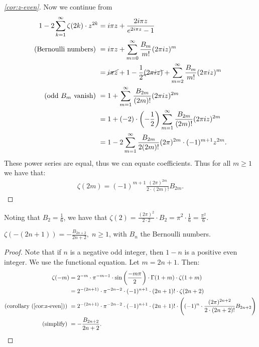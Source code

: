\begin{proof}[\ref{cor:z-even}]
Now we continue from
\begin{align*}
    1 - 2 \sum_{k=1}^\infty \zeta(2k) \cdot z^{2k} &= i \pi z + \frac{2i \pi z}{e^{2 i \pi z} - 1}\\
    \text{(Bernoulli numbers) }&= i \pi z + \sum_{m=0}^\infty \frac{B_m}{m!} (2 \pi i z)^m\\
    &= \cancel{i \pi z} + 1 - \frac{1}{2}\cancel{(2 \pi i z)} + \sum_{m=2}^\infty \frac{B_m}{m!} (2 \pi i z)^m\\
    \text{(odd $B_m$ vanish) } &= 1 + \sum_{m=1}^\infty \frac{B_{2m}}{(2m)!} (2 \pi i z)^{2m}\\
    &= 1 + (-2) \cdot \left( -\frac{1}{2} \right) \sum_{m=1}^\infty \frac{B_{2m}}{(2m)!} (2 \pi i z)^{2m}\\
    &= 1 - 2\sum_{m=1}^\infty \frac{B_{2m}}{2 (2m)!} (2 \pi)^{2m} \cdot (-1)^{m+1} z^{2m}.
\end{align*}
These power series are equal, thus we can equate coefficients. Thus for all $m \geq 1$ we have that:
\begin{align*}
    \zeta(2m) = (-1)^{m+1} \frac{(2\pi)^{2m}}{2 \cdot (2m)!} B_{2m}.
\end{align*}

\end{proof}

\begin{example} Noting that $B_2 = \frac{1}{6}$, we have that $\zeta(2) = \frac{(2\pi)^2}{2\cdot 2}\cdot B_2 = \pi ^ 2 \cdot \frac{1}{6} = \frac{\pi ^2 }{6}$.
\end{example}


\begin{corollary}\label{cor:z-neg-odd}
$\zeta(-(2n+1))= - \frac{B_{2n+2}}{2n+2}, \; n \geq 1$, with $B_n$ the Bernoulli numbers.
\end{corollary}

\begin{proof}
Note that if $n$ is a negative odd integer, then $1-n$ is a positive even integer. We use the functional equation. Let $m = 2n+1$. Then:
\begin{align*}
    \zeta(-m) &= 2^{-m} \cdot \pi^{-m-1} \cdot \sin\left( \frac{- m \pi}{2} \right) \cdot \Gamma(1+m) \cdot \zeta(1+m)\\
    &= 2^{-(2n+1)} \cdot \pi^{-2n-2} \cdot (-1)^{n+1} \cdot (2n+1)! \cdot \zeta(2n+2)\\
    \text{(corollary (\ref{cor:z-even})) } &= 2^{-(2n+1)} \cdot \pi^{-2n-2} \cdot (-1)^{n+1} \cdot (2n+1)! \cdot \left( (-1)^n \cdot \frac{(2 \pi)^{2n+2}}{2 \cdot (2n+2)!} B_{2n+2}  \right)\\
    \text{(simplify) }&= - \frac{B_{2n+2}}{2n+2}.
\end{align*}
\end{proof}

